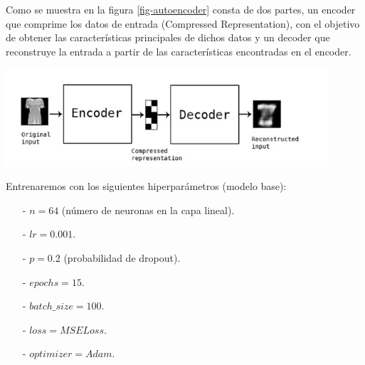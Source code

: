 \documentclass[aps,prl,reprint,groupedaddress]{revtex4-2}
\newenvironment{Figura}
  {\par\medskip\noindent\minipage{\linewidth}}
  {\endminipage\par\medskip}
\begin{document}
Como se muestra en la figura \ref{fig-autoencoder} consta de dos partes, un 
encoder que comprime los datos de entrada (Compressed Representation), con el 
objetivo de obtener las características principales de dichos datos y un 
decoder que reconstruye la entrada a partir de las características encontradas 
en el encoder.
\begin{Figura}
  \centering
  \includegraphics[width=0.90\textwidth]{figs/ejem_encoder_decoder.png}
  \label{fig-autoencoder}
\end{Figura}

Entrenaremos con los siguientes hiperparámetros (modelo base):
\begin{itemize}
  \item [-] $n = 64$ (número de neuronas en la capa lineal).
  \item [-] $lr = 0.001$.
  \item [-] $p = 0.2$ (probabilidad de dropout).
  \item [-] $epochs = 15$.
  \item [-] $batch\_size = 100$.
  \item [-] $loss = MSELoss$.
  \item [-] $optimizer = Adam$.
\end{itemize}
\end{document}
